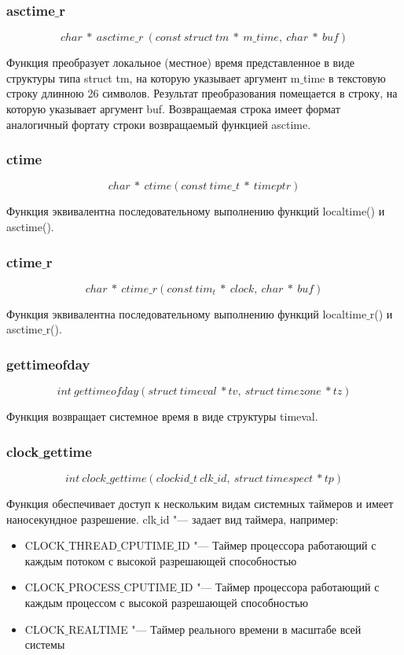 \documentclass{article}
\begin{document}
			\subsubsection*{asctime$\_$r}			
			$$char~*~asctime\_r~(const~struct~tm~*~m\_time,~char~*~buf)$$			
			
				Функция преобразует локальное (местное) время представленное в виде структуры типа struct tm, на которую 						указывает аргумент m$\_$time в текстовую строку длинною 26 символов. Результат преобразования помещается в строку, на 			которую указывает аргумент buf. Возвращаемая строка имеет формат аналогичный фортату строки возвращаемый функцией 					asctime.
				
			\subsubsection*{ctime}
				$$char~*~ctime(const~time\_t~ *~ timeptr)$$
				
				Функция эквивалентна последовательному выполнению функций localtime() и asctime().
			\subsubsection*{ctime$\_$r}				
				$$char~*~ctime\_r(const~tim_t~*~clock,~char~*~buf)$$

				Функция эквивалентна последовательному выполнению функций localtime$\_$r() и asctime$\_$r().
			\subsubsection*{gettimeofday}
			$$int~gettimeofday(struct~timeval~*tv,~struct~timezone~*tz)$$ 
			
				Функция возвращает системное время в виде структуры timeval.
			\subsubsection*{clock$\_$gettime}
			$$int~clock\_gettime(clockid\_t~clk\_id,~struct~timespect~*tp)$$
			
				Функция обеспечивает доступ к нескольким видам системных таймеров и имеет наносекундное разрешение. 
			clk$\_$id  "--- задает вид таймера, например:
			\begin{itemize}
				\item CLOCK$\_$THREAD$\_$CPUTIME$\_$ID "---	Таймер процессора работающий с каждым потоком с высокой разрешающей 						способностью		
				\item CLOCK$\_$PROCESS$\_$CPUTIME$\_$ID "---	Таймер процессора работающий с каждым процессом с высокой 								разрешающей способностью
				\item CLOCK$\_$REALTIME "--- Таймер реального времени в масштабе всей системы
			\end{itemize}					
\end{document}
